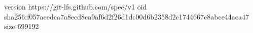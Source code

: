 version https://git-lfs.github.com/spec/v1
oid sha256:f057acedca7a8ecd8ca9af6d2f26d1dc00d6b2358d2c1744667c8abce44aca47
size 699192
